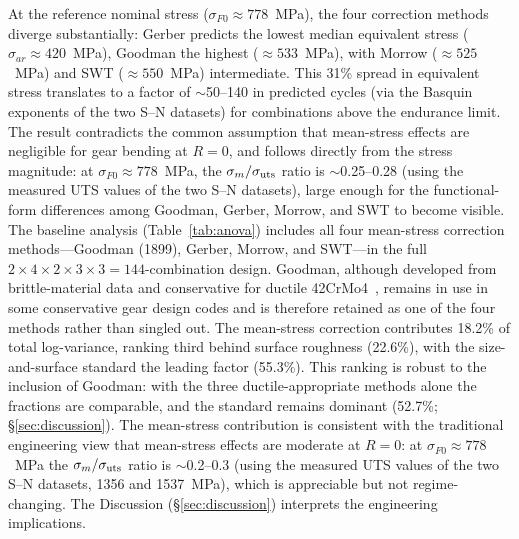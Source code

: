 \documentclass[twocolumn,12pt,a4paper]{article}
\begin{document}
At the reference nominal stress ($\sigma_{F0} \approx 778$~MPa), the
four correction methods diverge substantially: Gerber predicts the
lowest median equivalent stress ($\sigma_{ar} \approx 420$~MPa),
Goodman the highest ($\approx 533$~MPa), with Morrow
($\approx 525$~MPa) and SWT ($\approx 550$~MPa) intermediate. This
31\% spread in equivalent stress translates to a factor of
$\sim$50--140 in predicted cycles (via the Basquin exponents of the
two S--N datasets) for combinations above the endurance limit. The
result contradicts the common assumption that mean-stress effects are
negligible for gear bending at $R=0$, and follows directly from the
stress magnitude: at $\sigma_{F0} \approx 778$~MPa, the
$\sigma_m/\sigma_{\rm uts}$ ratio is $\sim$0.25--0.28 (using the
measured UTS values of the two S--N datasets), large enough for the
functional-form differences among Goodman, Gerber, Morrow, and SWT to
become visible.
The baseline analysis (Table~\ref{tab:anova}) includes all four
mean-stress correction methods---Goodman (1899), Gerber, Morrow, and
SWT---in the full $2\times4\times2\times3\times3 = 144$-combination
design. Goodman, although developed from brittle-material data and
conservative for ductile 42CrMo4~\cite{stephens2001}, remains in use
in some conservative gear design codes and is therefore retained as
one of the four methods rather than singled out. The mean-stress
correction contributes 18.2\% of total log-variance, ranking third
behind surface roughness (22.6\%), with the size-and-surface standard
the leading factor (55.3\%). This ranking is robust to the inclusion of
Goodman: with the three ductile-appropriate methods alone the
fractions are comparable, and the standard remains dominant
(52.7\%; \S\ref{sec:discussion}). The mean-stress contribution is
consistent with the traditional engineering view that mean-stress
effects are moderate at $R=0$: at $\sigma_{F0} \approx 778$~MPa the
$\sigma_m/\sigma_{\rm uts}$ ratio is $\sim$0.2--0.3 (using the
measured UTS values of the two S--N datasets, 1356 and 1537~MPa),
which is appreciable but not regime-changing. The Discussion
(\S\ref{sec:discussion}) interprets the engineering implications.
\end{document}
